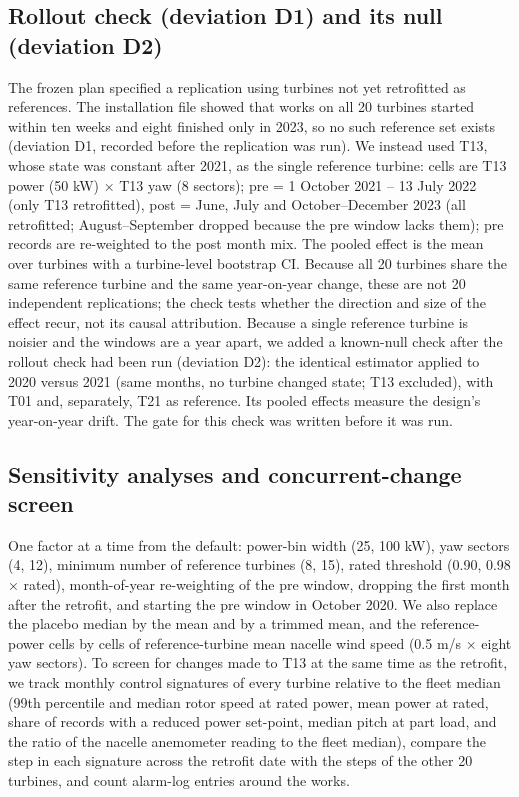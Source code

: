 \documentclass[preprint,12pt]{elsarticle}
\begin{document}
\subsection{Rollout check (deviation D1) and its null (deviation D2)}

The frozen plan specified a replication using turbines not yet retrofitted as references. The installation file showed that works on all 20 turbines started within ten weeks and eight finished only in 2023, so no such reference set exists (deviation D1, recorded before the replication was run). We instead used T13, whose state was constant after 2021, as the single reference turbine: cells are T13 power (50 kW) × T13 yaw (8 sectors); pre = 1 October 2021 -- 13 July 2022 (only T13 retrofitted), post = June, July and October--December 2023 (all retrofitted; August--September dropped because the pre window lacks them); pre records are re-weighted to the post month mix. The pooled effect is the mean over turbines with a turbine-level bootstrap CI. Because all 20 turbines share the same reference turbine and the same year-on-year change, these are not 20 independent replications; the check tests whether the direction and size of the effect recur, not its causal attribution.
Because a single reference turbine is noisier and the windows are a year apart, we added a known-null check after the rollout check had been run (deviation D2): the identical estimator applied to 2020 versus 2021 (same months, no turbine changed state; T13 excluded), with T01 and, separately, T21 as reference. Its pooled effects measure the design's year-on-year drift. The gate for this check was written before it was run.

\subsection{Sensitivity analyses and concurrent-change screen}

One factor at a time from the default: power-bin width (25, 100 kW), yaw sectors (4, 12), minimum number of reference turbines (8, 15), rated threshold (0.90, 0.98 × rated), month-of-year re-weighting of the pre window, dropping the first month after the retrofit, and starting the pre window in October 2020. We also replace the placebo median by the mean and by a trimmed mean, and the reference-power cells by cells of reference-turbine mean nacelle wind speed (0.5 m/s × eight yaw sectors). To screen for changes made to T13 at the same time as the retrofit, we track monthly control signatures of every turbine relative to the fleet median (99th percentile and median rotor speed at rated power, mean power at rated, share of records with a reduced power set-point, median pitch at part load, and the ratio of the nacelle anemometer reading to the fleet median), compare the step in each signature across the retrofit date with the steps of the other 20 turbines, and count alarm-log entries around the works.
\end{document}
